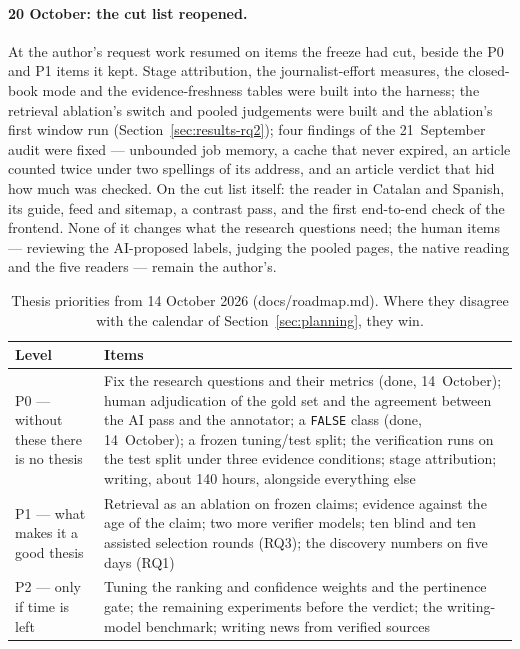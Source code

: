 \paragraph{20 October: the cut list reopened.} At the author's request
work resumed on items the freeze had cut, beside the P0 and P1 items it
kept. Stage attribution, the journalist-effort measures, the closed-book
mode and the evidence-freshness tables were built into the harness; the
retrieval ablation's switch and pooled judgements were built and the
ablation's first window run (Section~\ref{sec:results-rq2}); four
findings of the 21~September audit were fixed --- unbounded job memory,
a cache that never expired, an article counted twice under two
spellings of its address, and an article verdict that hid how much was
checked. On the cut list itself: the reader in Catalan and Spanish, its
guide, feed and sitemap, a contrast pass, and the first end-to-end
check of the frontend. None of it changes what the research questions
need; the human items --- reviewing the AI-proposed labels, judging the
pooled pages, the native reading and the five readers --- remain the
author's.

\begin{table}[ht]
\centering
\small
\caption{Thesis priorities from 14 October 2026 (docs/roadmap.md).
Where they disagree with the calendar of
Section~\ref{sec:planning}, they win.}
\label{tab:priorities}
\begin{tabularx}{\linewidth}{@{}lX@{}}
\toprule
Level & Items \\
\midrule
P0 --- without these there is no thesis & Fix the research questions
and their metrics (done, 14~October); human adjudication of the gold
set and the agreement between the AI pass and the annotator; a
\texttt{FALSE} class (done, 14~October); a frozen tuning/test split;
the verification runs on the test split under three evidence
conditions; stage attribution; writing, about 140 hours, alongside
everything else \\
\addlinespace
P1 --- what makes it a good thesis & Retrieval as an ablation on frozen
claims; evidence against the age of the claim; two more verifier
models; ten blind and ten assisted selection rounds (RQ3); the
discovery numbers on five days (RQ1) \\
\addlinespace
P2 --- only if time is left & Tuning the ranking and confidence weights
and the pertinence gate; the remaining experiments before the verdict;
the writing-model benchmark; writing news from verified sources \\
\bottomrule
\end{tabularx}
\end{table}
